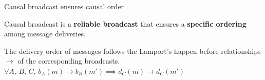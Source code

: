 \documentclass[10pt, xcolor={usenames, dvipsnames}]{beamer}
\begin{document}
\begin{frame}{Causal broadcast ensures causal order}

  Causal broadcast is a \textbf{reliable broadcast} that ensures a
  \textbf{specific ordering} among message deliveries.
  
  \vspace{1em}

  \begin{definition}
    The delivery order of messages follows the Lamport's happen before relationships
    $\rightarrow$ of the corresponding broadcasts.
    $\forall A,\,B,\,C,\, b_A(m) \rightarrow b_B(m') \implies d_C(m) \rightarrow
    d_C(m')$
  \end{definition}
  
  \begin{minipage}{0.49\textwidth}
      
  \end{minipage}~~
  \begin{minipage}{0.49\textwidth}
    \begin{center}
      
    \end{center}
  \end{minipage}


\end{frame}
\end{document}

